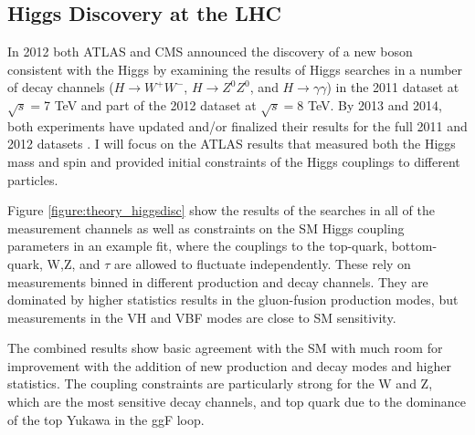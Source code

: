 \subsection{Higgs Discovery at the LHC}

In 2012 both ATLAS and CMS announced the discovery of a new boson consistent
with the Higgs by examining the results of Higgs searches in a number of decay
channels ($H\rightarrow W^+W^-$, $H\rightarrow Z^0Z^0$, and
    $H\rightarrow\gamma\gamma$) in the 2011 dataset at $\sqrt{s}=$7 TeV and
part of the 2012 dataset at $\sqrt{s}=$8 TeV. By 2013 and 2014, both
experiments have updated and/or finalized their results for the full 2011 and
2012 datasets \cite{ATLAS-CONF-2014-009,CMS-PAS-HIG-14-009}. I will focus on the ATLAS results 
that measured both the Higgs mass\cite{Aad:2014aba} and spin\cite{tagkey2013120} and
provided initial constraints of the Higgs couplings to different particles. 

Figure \ref{figure:theory_higgsdisc} show the results of the searches in all of the
measurement channels as well as constraints on the SM Higgs coupling parameters in 
an example fit, where the couplings to the top-quark, bottom-quark, W,Z, and $\tau$
are allowed to fluctuate independently. These rely on measurements binned in different
production and decay channels. They are dominated by higher statistics results in the 
gluon-fusion production modes, but measurements in the VH and VBF modes are close to 
SM sensitivity. 

The combined results show basic agreement with the SM with much room for improvement
with the addition of new production and decay modes and higher statistics. The 
coupling constraints are particularly strong for the W and Z, which are
the most sensitive decay channels, and top quark due to the dominance of the
top Yukawa in the ggF loop. 


